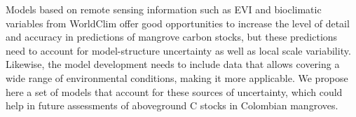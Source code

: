 \documentclass[review, authoryear]{elsarticle}   	%
\begin{document}
%
%

Models based on remote sensing information such as EVI and bioclimatic variables from WorldClim offer good opportunities to increase the level of detail and accuracy in predictions of mangrove carbon stocks, but these predictions need to account for model-structure uncertainty as well as local scale variability. Likewise, the model development needs to include data that allows covering a wide range of environmental conditions, making it more applicable. We propose here a set of models that account for these sources of uncertainty, which could help in future assessments of aboveground C stocks in Colombian mangroves.
\end{document}
